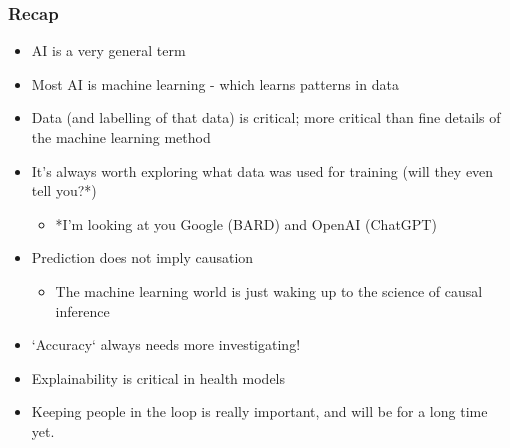 \begin{frame}
\frametitle{Recap}
\begin{itemize}
    \setlength{\itemsep}{2mm}
    \item AI is a very general term
    \item Most AI is machine learning - which learns patterns in data
    \item Data (and labelling of that data) is critical; more critical than fine details of the machine learning method
    \item It's always worth exploring what data was used for training (will they even tell you?*)  
    \begin{itemize}
        \item *I'm looking at you Google (BARD) and OpenAI (ChatGPT)
    \end{itemize}
    \item Prediction does not imply causation
    \begin{itemize}
        \item The machine learning world is just waking up to the science of causal inference
    \end{itemize}
    \item `Accuracy` always needs more investigating!
    \item Explainability is critical in health models
    \item Keeping people in the loop is really important, and will be for a long time yet.
\end{itemize}

\end{frame}